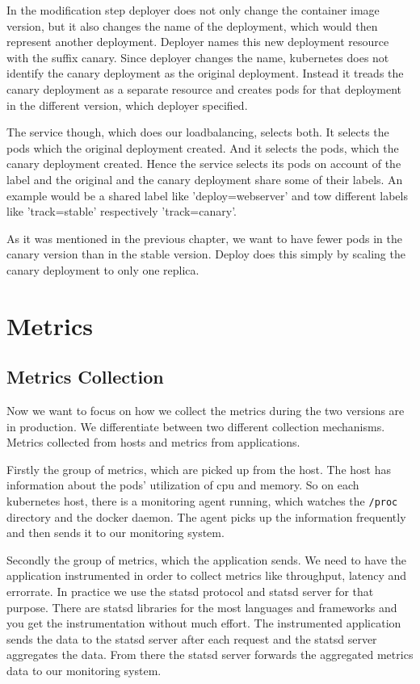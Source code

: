 In the modification step deployer does not only change the container image version, but it
also changes the name of the deployment, which would then represent another
deployment. Deployer names this new deployment resource with the suffix canary. Since
deployer changes the name, kubernetes does not identify the canary deployment as the
original deployment. Instead it treads the canary deployment as a separate resource and
creates pods for that deployment in the different version, which deployer specified.

The service though, which does our loadbalancing, selects both. It selects the pods which
the original deployment created. And it selects the pods, which the canary deployment
created. Hence the service selects its pods on account of the label and the original and
the canary deployment share some of their labels. An example would be a shared label like
'deploy=webserver' and tow different labels like 'track=stable' respectively
'track=canary'.

As it was mentioned in the previous chapter, we want to have fewer pods in the canary
version than in the stable version. Deploy does this simply by scaling the canary
deployment to only one replica.

\section{Metrics}

\subsection{Metrics Collection}

Now we want to focus on how we collect the metrics during the two versions are in
production. We differentiate between two different collection mechanisms. Metrics
collected from hosts and metrics from applications.

Firstly the group of metrics, which are picked up from the host. The host has information
about the pods' utilization of cpu and memory. So on each kubernetes host, there is a
monitoring agent running, which watches the \verb!/proc! directory and the docker
daemon. The agent picks up the information frequently and then sends it to our monitoring
system.

Secondly the group of metrics, which the application sends. We need to have the
application instrumented in order to collect metrics like throughput, latency and
errorrate. In practice we use the statsd protocol and statsd server for that
purpose. There are statsd libraries for the most languages and frameworks and you get the
instrumentation without much effort. The instrumented application sends the data to the
statsd server after each request and the statsd server aggregates the data. From there the
statsd server forwards the aggregated metrics data to our monitoring system.

